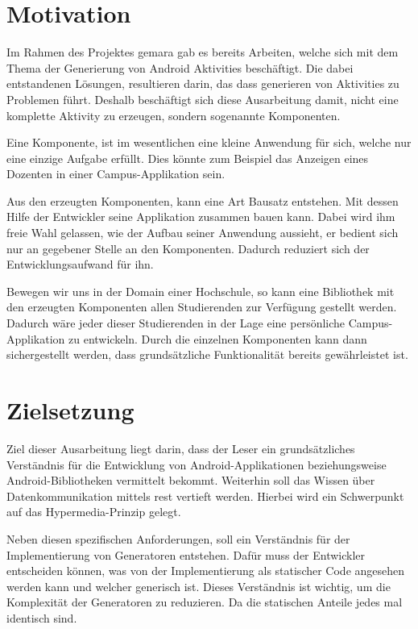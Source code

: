 \section{Motivation}\label{sec:motivation}
Im Rahmen des Projektes \ac{gemara} gab es bereits Arbeiten, welche sich mit dem Thema der Generierung von Android Aktivities beschäftigt. Die dabei entstandenen Lösungen, resultieren darin, das dass generieren von Aktivities zu Problemen führt. Deshalb beschäftigt sich diese Ausarbeitung damit, nicht eine komplette Aktivity zu erzeugen, sondern sogenannte Komponenten.

Eine Komponente, ist im wesentlichen eine kleine Anwendung für sich, welche nur eine einzige Aufgabe erfüllt. Dies könnte zum Beispiel das Anzeigen eines Dozenten in einer Campus-Applikation sein.

Aus den erzeugten Komponenten, kann eine Art Bausatz entstehen. Mit dessen Hilfe der Entwickler seine Applikation zusammen bauen kann. Dabei wird ihm freie Wahl gelassen, wie der Aufbau seiner Anwendung aussieht, er bedient sich nur an gegebener Stelle an den Komponenten. Dadurch reduziert sich der Entwicklungsaufwand für ihn.

Bewegen wir uns in der Domain einer Hochschule, so kann eine Bibliothek mit den erzeugten Komponenten allen Studierenden zur Verfügung gestellt werden. Dadurch wäre jeder dieser Studierenden in der Lage eine persönliche Campus-Applikation zu entwickeln. Durch die einzelnen Komponenten kann dann sichergestellt werden, dass grundsätzliche Funktionalität bereits gewährleistet ist.

\section{Zielsetzung}\label{sec:target}
Ziel dieser Ausarbeitung liegt darin, dass der Leser ein grundsätzliches Verständnis für die Entwicklung von Android-Applikationen beziehungsweise Android-Bibliotheken vermittelt bekommt. Weiterhin soll das Wissen über Datenkommunikation mittels \ac{rest} vertieft werden. Hierbei wird ein Schwerpunkt auf das Hypermedia-Prinzip gelegt. 

Neben diesen spezifischen Anforderungen, soll ein Verständnis für der Implementierung von Generatoren entstehen. Dafür muss der Entwickler entscheiden können, was von der Implementierung als statischer Code angesehen werden kann und welcher generisch ist. Dieses Verständnis ist wichtig, um die Komplexität der Generatoren zu reduzieren. Da die statischen Anteile jedes mal identisch sind.

